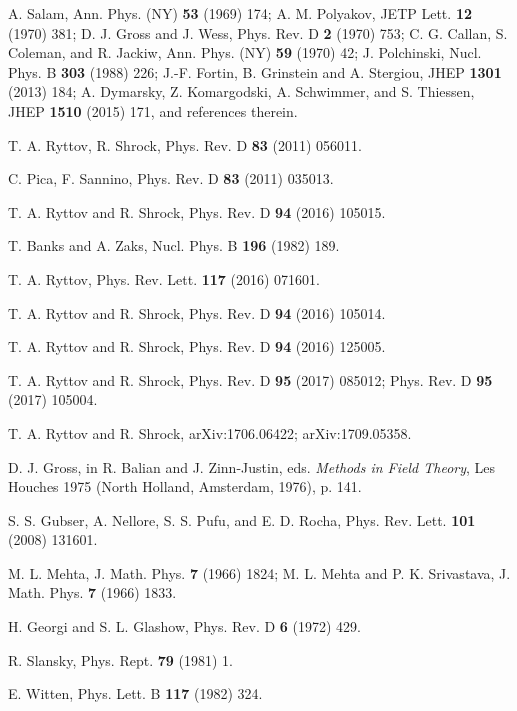 \documentclass[prd,twocolumn,nofootinbib,amsfonts,amssymb]{revtex4}
\begin{document}
\begin{thebibliography}{99}

 A. Salam, Ann. Phys. (NY) {\bf 53} (1969) 174;
  A. M. Polyakov, JETP Lett. {\bf 12} (1970) 381;
  D. J. Gross and J. Wess, Phys. Rev. D {\bf 2} (1970) 753; C. G. Callan,
  S. Coleman, and R. Jackiw, Ann. Phys. (NY) {\bf 59} (1970) 42;
  J. Polchinski, Nucl. Phys. B {\bf 303} (1988) 226;
  J.-F. Fortin, B. Grinstein and A. Stergiou, JHEP {\bf 1301} (2013) 184;
  A. Dymarsky, Z. Komargodski, A. Schwimmer, and S. Thiessen, JHEP {\bf 1510}
  (2015) 171, and references therein.

T. A. Ryttov, R. Shrock, Phys. Rev. D {\bf 83} (2011) 056011.

C. Pica, F. Sannino, Phys. Rev. D {\bf 83} (2011) 035013.

T. A. Ryttov and R. Shrock, Phys. Rev. D {\bf 94} (2016) 105015.

T. Banks and A. Zaks, Nucl. Phys. B {\bf 196} (1982) 189.

T. A. Ryttov, Phys. Rev. Lett. {\bf 117} (2016) 071601.

T. A. Ryttov and R. Shrock, Phys. Rev. D {\bf 94} (2016) 105014.

T. A. Ryttov and R. Shrock, Phys. Rev. D {\bf 94} (2016) 125005.

T. A. Ryttov and R. Shrock, Phys. Rev. D {\bf 95} (2017) 085012;
Phys. Rev. D {\bf 95} (2017) 105004.

T. A. Ryttov and R. Shrock, arXiv:1706.06422; arXiv:1709.05358. 

D. J. Gross, in R. Balian and J. Zinn-Justin, eds. 
{\it Methods in Field Theory}, Les Houches 1975 
(North Holland, Amsterdam, 1976), p. 141.

S. S. Gubser, A. Nellore, S. S. Pufu, and E. D. Rocha, Phys. Rev. Lett. 
{\bf 101} (2008) 131601. 

M. L. Mehta, J. Math. Phys. {\bf 7} (1966) 1824; M. L.
Mehta and P. K. Srivastava, J. Math. Phys. {\bf 7} (1966) 1833.


H. Georgi and S. L. Glashow, Phys. Rev. D {\bf 6} (1972) 429.

R. Slansky, Phys. Rept. {\bf 79} (1981) 1. 

E. Witten, Phys. Lett. B {\bf 117} (1982) 324. 


\end{thebibliography}
\end{document}
